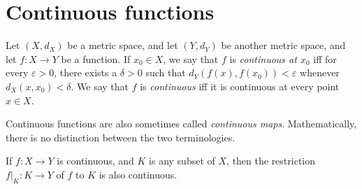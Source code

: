 \section{Continuous functions}\label{ii:sec:2.1}

\begin{defn}\label{ii:2.1.1}
  Let \((X, d_X)\) be a metric space, and let \((Y, d_Y)\) be another metric space, and let \(f : X \to Y\) be a function.
  If \(x_0 \in X\), we say that \(f\) is \emph{continuous at \(x_0\)} iff for every \(\varepsilon > 0\), there exists a \(\delta > 0\) such that \(d_Y(f(x), f(x_0 )) < \varepsilon\) whenever \(d_X(x, x_0) < \delta\).
  We say that \(f\) is \emph{continuous} iff it is continuous at every point \(x \in X\).
\end{defn}

\begin{rmk}\label{ii:2.1.2}
  Continuous functions are also sometimes called \emph{continuous maps}.
  Mathematically, there is no distinction between the two terminologies.
\end{rmk}

\begin{rmk}\label{ii:2.1.3}
  If \(f : X \to Y\) is continuous, and \(K\) is any subset of \(X\), then the restriction \(f|_K : K \to Y\) of \(f\) to \(K\) is also continuous.
\end{rmk}

